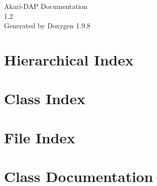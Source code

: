 \documentclass[twoside]{book}
\newcommand{\+}{\discretionary{\mbox{\scriptsize$\hookleftarrow$}}{}{}}
\newcommand{\clearemptydoublepage}{%
    \newpage{\pagestyle{empty}\cleardoublepage}%
  }
\begin{document}
  \raggedbottom
  \begin{titlepage}
  \vspace*{7cm}
  \begin{center}%
  {\Large Akari-\/\+DAP Documentation}\\
  [1ex]\large 1.\+2 \\
  \vspace*{1cm}
  {\large Generated by Doxygen 1.9.8}\\
  \end{center}
  \end{titlepage}
  \clearemptydoublepage
  \tableofcontents
  \clearemptydoublepage

\chapter{Hierarchical Index}

\chapter{Class Index}

\chapter{File Index}

\chapter{Class Documentation}



























\end{document}
